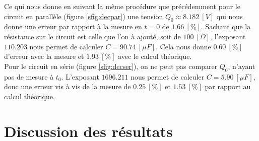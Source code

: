 \documentclass[11pt]{article}
\begin{document}
Ce qui nous donne en suivant la même procédure que précédemment pour le circuit en parallèle (figure \ref{sfig:decpar}) une tension $Q_0 \approx 8.182 \ [V]$ qui nous donne une erreur par rapport à la mesure en $t=0$ de $1.66 \ [\%]$. Sachant que la résistance sur le circuit est celle que l'on à ajouté, soit de $100 \ [\Omega]$, l'exposant $110.203$ nous permet de calculer $C = 90.74 \ [\mu F]$. Cela nous donne $0.60 \ [\%]$ d'erreur avec la mesure et $1.93 \ [\%]$ avec le calcul théorique.\\
Pour le circuit en série (figure \ref{sfig:decser}), on ne peut pas comparer $Q_0$, n'ayant pas de mesure à $t_0$. L'exposant $1696.211$ nous permet de calculer $C = 5.90 \ [\mu F]$, donc une erreur vis à vis de la mesure de $0.25 \ [\%]$ et $1.53 \ [\%]$ par rapport au calcul théorique.

\section{Discussion des résultats}
\end{document}
